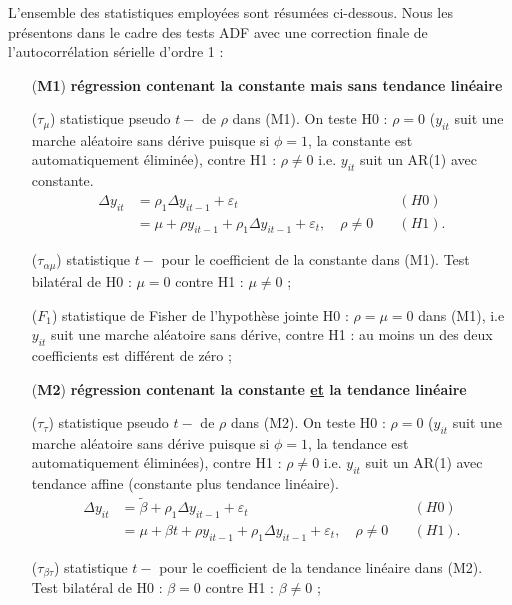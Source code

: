 \documentclass{article}
\begin{document}
L'ensemble des statistiques employ\'ees sont r\'esum\'ees
ci-dessous. Nous les pr\'esentons dans le cadre des tests ADF avec
une correction finale de l'autocorr\'elation s\'erielle d'ordre 1 :
\begin{itemize} \item[(\textbf{M1})]{\textbf{r\'egression contenant
la constante mais sans tendance lin\'eaire}}
\item[($\tau_{\mu}$)] statistique pseudo $t-$ de $\rho$ dans
(M1). On teste H0 : $\rho=0$ ($y_{it}$ suit une marche al\'eatoire
sans d\'erive puisque si $\phi=1$, la constante est automatiquement
\'elimin\'ee), contre H1 : $\rho\not=0$ i.e. $y_{it}$ suit un AR(1)
avec constante. $$\begin{array}{clr}\Delta y_{it} & = \rho_1\Delta
y_{it-1}+\varepsilon_t & (H0)\\ & = \mu+\rho y_{it-1}+\rho_1\Delta
y_{it-1}+\varepsilon_t,\quad \rho\not=0\quad & (H1).\end{array}$$

\item[($\tau_{\alpha\mu}$)] statistique $t-$ pour le coefficient
de la constante dans (M1). Test bilat\'eral de H0 : $\mu=0$ contre
H1 : $\mu\not=0$ ;

\item[($F_1$)] statistique de Fisher de l'hypoth\`ese jointe
H0 : $\rho=\mu=0$ dans (M1), i.e $y_{it}$ suit une marche
al\'eatoire sans d\'erive, contre H1 : au moins un des deux
coefficients est diff\'erent de z\'ero ;

\item[(\textbf{M2})]{\textbf{r\'egression contenant la
constante \underline{et} la tendance lin\'eaire}}
\item[($\tau_{\tau}$)] statistique pseudo $t-$ de $\rho$ dans
(M2). On teste H0 : $\rho=0$ ($y_{it}$ suit une marche al\'eatoire
sans d\'erive puisque si $\phi=1$, la tendance est automatiquement
\'elimin\'ees), contre H1 : $\rho\not=0$ i.e. $y_{it}$ suit un AR(1)
avec tendance affine (constante plus tendance lin\'eaire).
$$\begin{array}{clr}\Delta y_{it} & = \tilde{\beta}+\rho_1\Delta
y_{it-1}+\varepsilon_t & (H0)\\ & = \mu+\beta t+\rho
y_{it-1}+\rho_1\Delta y_{it-1}+\varepsilon_t,\quad \rho\not=0\quad &
(H1).\end{array}$$

\item[($\tau_{\beta\tau}$)]
statistique $t-$ pour le coefficient de la tendance lin\'eaire dans
(M2). Test bilat\'eral de H0 : $\beta=0$ contre H1 : $\beta\not=0$ ;


\end{itemize}
\end{document}
